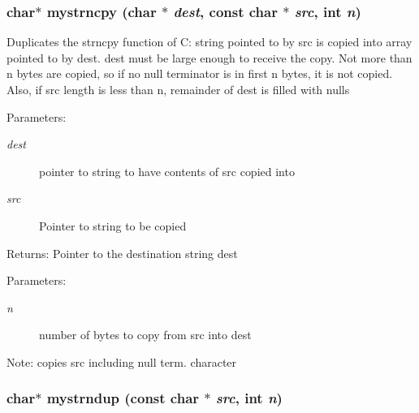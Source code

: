 \subsubsection{\setlength{\rightskip}{0pt plus 5cm}char$\ast$ mystrncpy (char $\ast$ {\em dest}, const char $\ast$ {\em src}, int {\em n})}\label{mystring_8c_90a633351ed616644738f44135441ca9}


Duplicates the strncpy function of C: string pointed to by src is copied into array pointed to by dest. dest must be large enough to receive the copy. Not more than n bytes are copied, so if no null terminator is in first n bytes, it is not copied. Also, if src length is less than n, remainder of dest is filled with nulls \begin{Desc}
\item[Parameters:]
\begin{description}
\item[{\em dest}]pointer to string to have contents of src copied into \item[{\em src}]Pointer to string to be copied \end{description}
\end{Desc}
\begin{Desc}
\item[Returns:]Pointer to the destination string dest \end{Desc}
\begin{Desc}
\item[Parameters:]
\begin{description}
\item[{\em n}]number of bytes to copy from src into dest \end{description}
\end{Desc}
\begin{Desc}
\item[Note:]copies src including null term. character \end{Desc}
\subsubsection{\setlength{\rightskip}{0pt plus 5cm}char$\ast$ mystrndup (const char $\ast$ {\em src}, int {\em n})}\label{mystring_8c_4ed664b8f2f1131da7a773fa4fd7c708}


